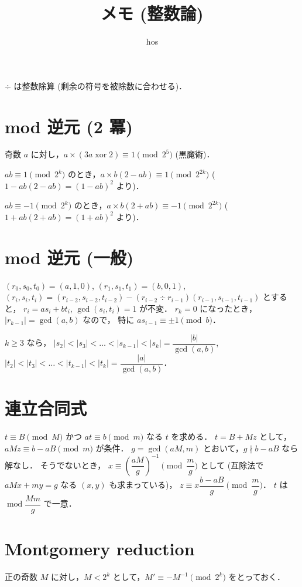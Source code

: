 \documentclass{jsarticle}
\title{メモ (整数論)}
\author{hos}
\DeclareMathOperator{\Mod}{mod}
\DeclareMathOperator{\xor}{xor}
\begin{document}
\maketitle

$\div$ は整数除算 (剰余の符号を被除数に合わせる)．


\section{mod 逆元 (2 冪)}
奇数 $a$ に対し，$a \times (3a \xor 2) \equiv 1 \pmod{2^5}$ (黒魔術)．

$a b \equiv 1 \pmod{2^k}$ のとき，$a \times b (2 - a b) \equiv 1 \pmod{2^{2k}}$ ($1 - a b (2 - a b) = (1 - a b)^2$ より)．

$a b \equiv -1 \pmod{2^k}$ のとき，$a \times b (2 + a b) \equiv -1 \pmod{2^{2k}}$ ($1 + a b (2 + a b) = (1 + a b)^2$ より)．


\section{mod 逆元 (一般)}
$(r_0, s_0, t_0) = (a, 1, 0)$, 
$(r_1, s_1, t_1) = (b, 0, 1)$, 
$(r_i, s_i, t_i) = (r_{i-2}, s_{i-2}, t_{i-2}) - (r_{i-2} \div r_{i-1}) (r_{i-1}, s_{i-1}, t_{i-1})$ とすると，
$r_i = a s_i + b t_i$, $\gcd(s_i, t_i) = 1$ が不変．
$r_k = 0$ になったとき，$\lvert r_{k-1} \rvert = \gcd(a, b)$ なので，
特に $a s_{i-1} \equiv \pm 1 \pmod{b}$．

$k \ge 3$ なら，
$|s_2| < |s_3| < \dots < |s_{k-1}| < |s_k| = \dfrac{\lvert b \rvert}{\gcd(a, b)}$, 
$|t_2| < |t_3| < \dots < |t_{k-1}| < |t_k| = \dfrac{\lvert a \rvert}{\gcd(a, b)}$．


\section{連立合同式}
$t \equiv B \pmod{M}$ かつ $a t \equiv b \pmod{m}$ なる $t$ を求める．
$t = B + M z$ として，$a M z \equiv b - a B \pmod{m}$ が条件．
$g = \gcd(a M, m)$ とおいて，$g \nmid b - a B$ なら解なし．
そうでないとき，
$x \equiv \left( \dfrac{a M}{g} \right)^{-1} \pmod{\dfrac{m}{g}}$ として (互除法で $a M x + m y = g$ なる $(x, y)$ も求まっている)，
$z \equiv x \dfrac{b - a B}{g} \pmod{\dfrac{m}{g}}$．
$t$ は $\Mod \dfrac{M m}{g}$ で一意．


\section{Montgomery reduction}
正の奇数 $M$ に対し，$M < 2^k$ として，$M' \equiv -M^{-1} \pmod{2^k}$ をとっておく．
\end{document}
